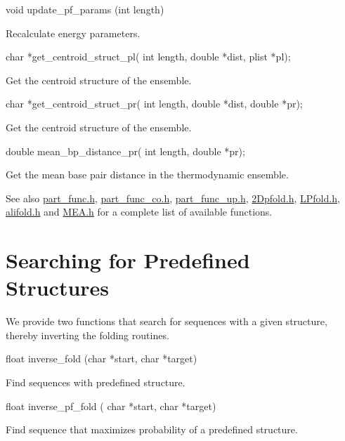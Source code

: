 \begin{DoxyVerb}
void update_pf_params (int length)
\end{DoxyVerb}
 Recalculate energy parameters. 

\begin{DoxyVerb}
char *get_centroid_struct_pl( int length,
                              double *dist,
                              plist *pl);
\end{DoxyVerb}
 Get the centroid structure of the ensemble. 

\begin{DoxyVerb}
char *get_centroid_struct_pr( int length,
                              double *dist,
                              double *pr);
\end{DoxyVerb}
 Get the centroid structure of the ensemble. 

\begin{DoxyVerb}
double mean_bp_distance_pr( int length,
                            double *pr);
\end{DoxyVerb}
 Get the mean base pair distance in the thermodynamic ensemble. 

\begin{DoxySeeAlso}{See also}
\hyperlink{part__func_8h}{part\_\-func.h}, \hyperlink{part__func__co_8h}{part\_\-func\_\-co.h}, \hyperlink{part__func__up_8h}{part\_\-func\_\-up.h}, \hyperlink{2Dpfold_8h}{2Dpfold.h}, \hyperlink{LPfold_8h}{LPfold.h}, \hyperlink{alifold_8h}{alifold.h} and \hyperlink{MEA_8h}{MEA.h} for a complete list of available functions.
\end{DoxySeeAlso}
\hypertarget{mp__fold_mp_Inverse_Fold}{}\section{Searching for Predefined Structures}\label{mp__fold_mp_Inverse_Fold}
We provide two functions that search for sequences with a given structure, thereby inverting the folding routines.

\begin{DoxyVerb}
float inverse_fold (char *start,
                    char *target)
\end{DoxyVerb}
 Find sequences with predefined structure. 

\begin{DoxyVerb}
float inverse_pf_fold ( char *start,
                        char *target)
\end{DoxyVerb}
 Find sequence that maximizes probability of a predefined structure. 

